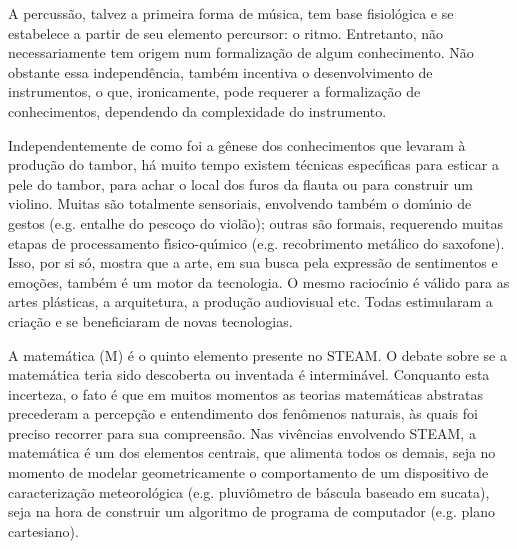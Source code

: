 \documentclass[
12pt,		%
openright,	%
twoside,  %
a4paper,			%
chapter=TITLE,		%
english,			%
french,				%
spanish,			%
brazil				%
]{USPSC-classe/USPSC}
\begin{document}
A percuss\~ao, talvez a primeira forma de m\'usica, tem base fisiol\'ogica e se estabelece a partir de seu elemento percursor: o ritmo. Entretanto, n\~ao necessariamente tem origem num formaliza\c{c}\~ao de algum conhecimento. N\~ao obstante essa independ\^encia, tamb\'em incentiva o desenvolvimento de instrumentos, o que, ironicamente, pode requerer a formaliza\c{c}\~ao de conhecimentos, dependendo da complexidade do instrumento.









Independentemente de como foi a g\^enese dos conhecimentos que levaram \`a produ\c{c}\~ao do tambor, h\'a muito tempo existem t\'ecnicas espec\'{\i}ficas para esticar a pele do tambor, para achar o local dos furos da flauta ou para construir um violino. Muitas s\~ao totalmente sensoriais, envolvendo tamb\'em o dom\'{\i}nio de gestos (e.g. entalhe do pesco\c{c}o do viol\~ao); outras s\~ao formais, requerendo muitas etapas de processamento f\'{\i}sico-qu\'{\i}mico (e.g. recobrimento met\'alico do saxofone). Isso, por si s\'o, mostra que a arte, em sua busca pela express\~ao de sentimentos e emo\c{c}\~oes, tamb\'em \'e um motor da tecnologia. O mesmo racioc\'{\i}nio \'e v\'alido para as artes pl\'asticas, a arquitetura, a produ\c{c}\~ao audiovisual etc. Todas estimularam a cria\c{c}\~ao e se beneficiaram de novas tecnologias.









A matem\'atica (M) \'e o quinto elemento presente no STEAM. O debate sobre se a matem\'atica teria sido descoberta ou inventada \'e intermin\'avel. Conquanto esta incerteza, o fato \'e que em muitos momentos as teorias matem\'aticas abstratas precederam a percep\c{c}\~ao e entendimento dos fen\^omenos naturais, \`as quais foi preciso recorrer para sua compreens\~ao. Nas viv\^encias envolvendo STEAM, a matem\'atica \'e um dos elementos centrais, que alimenta todos os demais, seja no momento de modelar geometricamente o comportamento de um dispositivo de caracteriza\c{c}\~ao meteorol\'ogica (e.g. pluvi\^ometro de b\'ascula baseado em sucata), seja na hora de construir um algoritmo de programa de computador (e.g. plano cartesiano).
\end{document}
